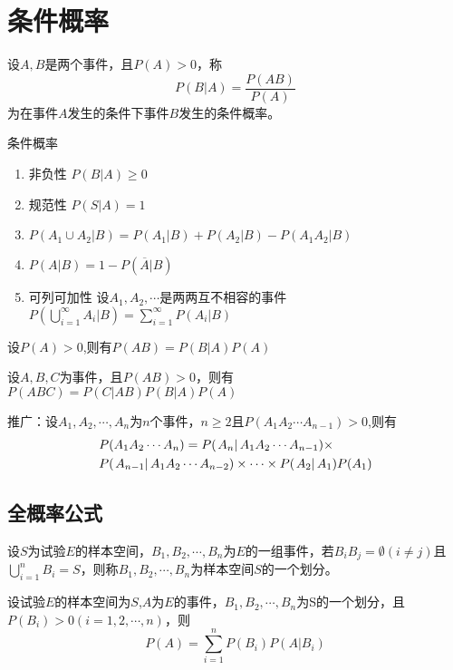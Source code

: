 \section{条件概率}
\begin{definition}
    设$A,B$是两个事件，且$P(A) > 0$，称$$P(B|A) = \frac{{P(AB)}}{{P(A)}}$$为在事件$A$发生的条件下事件$B$发生的条件概率。
\end{definition}
\begin{property} %
    条件概率
    \begin{enumerate}
        \item 非负性 $P(B|A) \ge 0$
        \item 规范性 $P(S|A) = 1$
        \item $P(\left. {{A_1} \cup {A_2}} \right|B) = P(\left. {{A_1}} \right|B) + P(\left. {{A_2}} \right|B) - P(\left. {{A_1}{A_2}} \right|B)$
        \item $P( A |B) = 1 - P(\overline A|B)$
        \item 可列可加性 设$A_1,A_2,\cdots$是两两互不相容的事件 $P(\left. {\bigcup\limits_{i = 1}^\infty  {{A_i}} } \right.|B) = \sum\limits_{i = 1}^\infty  {P(\left. {{A_i}} \right|B)} $
    \end{enumerate}
\end{property}


\begin{theorem}[乘法定理]
    设$P(A) > 0$,则有$P(AB) = P(\left. B \right.|A)P(A)$

    设$A,B,C$为事件，且$P(AB)>0$，则有$P(ABC) = P(\left. C \right|AB)P(\left. B \right|A)P(A)$
\end{theorem}



推广：设${A_1},{A_2}, \cdots ,{A_n}$为$n$个事件，$n \ge 2$且$P({A_1}{A_2} \cdots {A_{n - 1}}) > 0$,则有
\begin{equation}
    \begin{gathered}
        P({A_1}{A_2} \cdots {A_n}) = P(\left. {{A_n}} \right|{A_1}{A_2} \cdots {A_{n - 1}}) \times  \hfill \\
        P(\left. {{A_{n - 1}}} \right|{A_1}{A_2} \cdots {A_{n - 2}}) \times  \cdots  \times P(\left. {{A_2}} \right|{A_1})P({A_1})
    \end{gathered}
\end{equation}

\subsection{全概率公式}
\begin{definition}[样本空间的划分]
    设$S$为试验$E$的样本空间，$B_1,B_2,\cdots,B_n$为$E$的一组事件，若$B_iB_j = \emptyset (i \ne j)$且$\bigcup\limits_{i = 1}^n {{B_i}}  = S$，则称$B_1,B_2,\cdots,B_n$为样本空间$S$的一个划分。
\end{definition}
\begin{theorem}[全概率公式]
    设试验$E$的样本空间为$S$,$A$为$E$的事件，$B_1,B_2,\cdots,B_n$为S的一个划分，且$P(B_i) > 0(i = 1,2,\cdots,n)$，则
    $$P(A) = \sum\limits_{i = 1}^n {P({B_i})P(\left. A \right|{B_i})}
    $$
\end{theorem}


